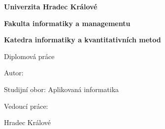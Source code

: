\cleardoublepage{}

\begin{center}
  \vspace{10mm}

  \textbf{\textsf{\Large{
    Univerzita Hradec Králové
  }}}
  
  \textbf{\textsf{\Large{
    Fakulta informatiky a managementu
  }}}
  
  \textbf{\textsf{\Large{
    Katedra informatiky a kvantitativních metod
  }}}

  \vspace{50mm}

  \textsf{\Large{\textbf{\Title}}}

  \textsf{\Large{
    Diplomová práce
  }}
  
\end{center} 

\vspace{50mm}

\textsf{\large{
	Autor: \Author
}}

\textsf{\large{
	Studijní obor: Aplikovaná informatika
}}

\vspace{20mm}

\textsf{\large{
	Vedoucí práce: \Supervisor
}}

\vspace*{\fill}

\large{Hradec Králové}
\hfill{\large{\Month}}

\clearpage{}